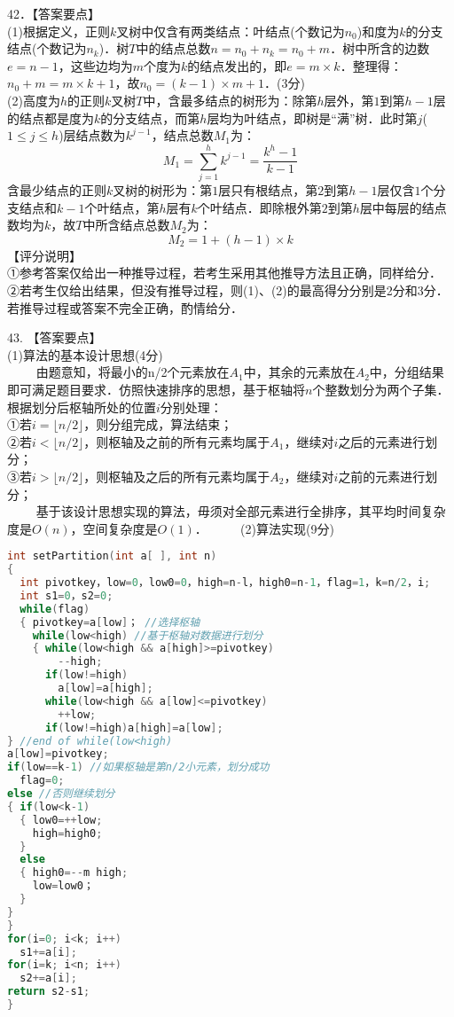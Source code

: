 42．【答案要点】 \\
(1)根据定义，正则$k$叉树中仅含有两类结点：叶结点(个数记为$n_0$)和度为$k$的分支结点(个数记为$n_k$)．树$T$中的结点总数$n=n_0+n_k=n_0+m$．树中所含的边数$e=n-1$，这些边均为$m$个度为$k$的结点发出的，即$e=m\times k$．整理得：$n_0+m=m\times k+1$，故$n_0=(k-1)\times m+1$．(3分) \\
(2)高度为$h$的正则$k$叉树$T$中，含最多结点的树形为：除第$h$层外，第$1$到第$h-1$层的结点都是度为$k$的分支结点，而第$h$层均为叶结点，即树是“满”树．此时第$j$($1\leqslant j\leqslant h$)层结点数为$k^{j-1}$，结点总数$M_1$为：
\begin{equation}
M_1=\sum_{j=1}^{h}k^{j-1}=\frac{k^h-1}{k-1}
\end{equation}
含最少结点的正则$k$叉树的树形为：第$1$层只有根结点，第$2$到第$h-1$层仅含$1$个分支结点和$k-1$个叶结点，第$h$层有$k$个叶结点．即除根外第$2$到第$h$层中每层的结点数均为$k$，故$T$中所含结点总数$M_2$为： \\
\begin{equation}
M_2=1+(h-1)\times k
\end{equation}
【评分说明】 \\
①参考答案仅给出一种推导过程，若考生采用其他推导方法且正确，同样给分． \\
②若考生仅给出结果，但没有推导过程，则(1)、(2)的最高得分分别是2分和3分．若推导过程或答案不完全正确，酌情给分．

43. 【答案要点】 \\
(1)算法的基本设计思想(4分) \\
$\qquad$ 由题意知，将最小的n/2个元素放在$A_1$中，其余的元素放在$A_2$中，分组结果即可满足题目要求．仿照快速排序的思想，基于枢轴将$n$个整数划分为两个子集．根据划分后枢轴所处的位置$i$分别处理： \\
①若$i= \lfloor n/2 \rfloor$，则分组完成，算法结束； \\
②若$i< \lfloor n/2 \rfloor $，则枢轴及之前的所有元素均属于$A_1$，继续对$i$之后的元素进行划分； \\
③若$i> \lfloor n/2 \rfloor$，则枢轴及之后的所有元素均属于$A_2$，继续对$i$之前的元素进行划分； \\
$\qquad$ 基于该设计思想实现的算法，毋须对全部元素进行全排序，其平均时间复杂度是$O(n)$，空间复杂度是$O(1)$．
$\qquad$ (2)算法实现(9分) \\
\begin{lstlisting}[language=cpp]
int setPartition(int a[ ], int n)
{ 
  int pivotkey，low=0，low0=0，high=n-l，high0=n-1，flag=1，k=n/2，i;
  int s1=0，s2=0;
  while(flag)
  { pivotkey=a[low]； //选择枢轴
    while(low<high) //基于枢轴对数据进行划分
    { while(low<high && a[high]>=pivotkey)
        --high;
      if(low!=high)
        a[low]=a[high];
      while(low<high && a[low]<=pivotkey)
        ++low;
      if(low!=high)a[high]=a[low];
} //end of while(low<high)
a[low]=pivotkey;
if(low==k-1) //如果枢轴是第n/2小元素，划分成功
  flag=0;
else //否则继续划分
{ if(low<k-1)
  { low0=++low;
    high=high0;
  }
  else
  { high0=--m high;
    low=low0；
  }
}
}
for(i=0; i<k; i++)
  s1+=a[i];
for(i=k; i<n; i++)
  s2+=a[i];
return s2-s1;
}
\end{lstlisting}